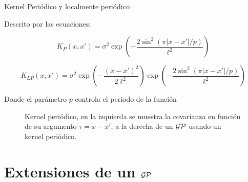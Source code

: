 \documentclass[handout, 9pt]{beamer}
\begin{document}
\begin{frame}{Kernel Periódico y localmente periódico}
    
    Descrito por las ecuaciones:

    \begin{equation*}
        K_{P}(x, x') = \sigma^2 \exp\left(-\frac{2\sin^2\left(\pi |x- x'| / p \right)}{\ell^2 } \right)
    \end{equation*}
    
    \begin{equation*}
        K_{LP}(x, x') = \sigma^2  \exp\left(-\frac{\left(x- x' \right)^2}{2\ell^2 } \right) \exp\left(-\frac{2\sin^2\left(\pi |x- x'| / p \right)}{\ell^2 } \right)
    \end{equation*}

    Donde el parámetro $p$ controla el periodo de la función \pause

    \begin{figure}[H]
        \centering
        \caption{Kernel periódico, en la izquierda se muestra la covarianza en función de su argumento $\tau=x-x'$, a la derecha de un $\mathcal{GP}$ usando un kernel periódico.}
    \end{figure}
 

    
\end{frame}

\section{Extensiones de un $\mathcal{GP}$}
\end{document}
